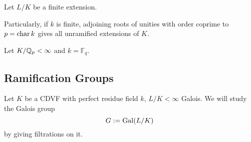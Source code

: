 \begin{proposition}
    Let $L/K$ be a finite extension.
\end{proposition}

Particularly, if $k$ is finite, adjoining roots of unities with order coprime to $p = \operatorname{char} k$ gives all unramified extensions of $K$.

\begin{example}
    Let $K/\mathbb{Q}_p < \infty$ and $k = \mathbb{F}_q$.
\end{example}

\subsection{Ramification Groups}

Let $K$ be a CDVF with perfect residue field $k$, $L/K<\infty$ Galois. We will study the Galois group \[G := \operatorname{Gal}(L/K)\] by giving filtrations on it.


